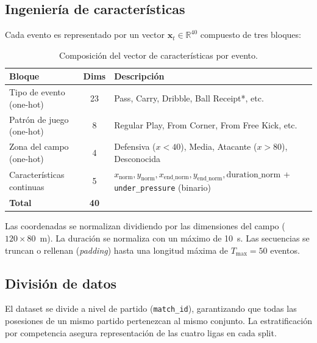\documentclass[12pt,a4paper]{article}
\newcommand{\code}[1]{\texttt{\small #1}}
\begin{document}
\subsection{Ingeniería de características}
\label{sec:features}

Cada evento es representado por un vector $\mathbf{x}_t \in \mathbb{R}^{40}$
compuesto de tres bloques:

\begin{table}[H]
\centering
\caption{Composición del vector de características por evento.}
\begin{tabularx}{\linewidth}{lcX}
\toprule
\textbf{Bloque} & \textbf{Dims} & \textbf{Descripción} \\
\midrule
Tipo de evento (one-hot)    & 23 & Pass, Carry, Dribble, Ball Receipt*, etc. \\
Patrón de juego (one-hot)   & 8  & Regular Play, From Corner, From Free Kick, etc. \\
Zona del campo (one-hot)    & 4  & Defensiva ($x<40$), Media, Atacante ($x>80$), Desconocida \\
\midrule
Características continuas   & 5  & $x_\text{norm}, y_\text{norm}, x_\text{end\_norm}, y_\text{end\_norm}, \text{duration\_norm}$ + \code{under\_pressure} (binario) \\
\midrule
\textbf{Total}              & \textbf{40} & \\
\bottomrule
\end{tabularx}
\label{tab:features}
\end{table}

Las coordenadas se normalizan dividiendo por las dimensiones del campo ($120 \times 80$~m).
La duración se normaliza con un máximo de 10~s. Las secuencias se truncan o rellenan
(\textit{padding}) hasta una longitud máxima de $T_{\max} = 50$ eventos.

\subsection{División de datos}

El dataset se divide a nivel de partido (\texttt{match\_id}), garantizando que
todas las posesiones de un mismo partido pertenezcan al mismo conjunto.
La estratificación por competencia asegura representación de las cuatro ligas
en cada split.
\end{document}
